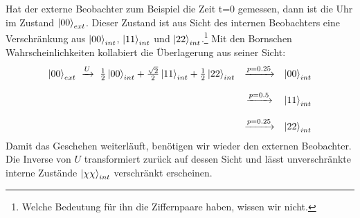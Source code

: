 \documentclass[12pt]{article}
\begin{document}
Hat der externe Beobachter zum Beispiel die Zeit t=0 gemessen, dann ist die Uhr im Zustand $\ket{00}_{ext}$. Dieser Zustand ist aus Sicht des internen Beobachters eine Verschränkung aus $\ket{00}_{int}$, $\ket{11}_{int}$ und $\ket{22}_{int}$.\footnote{Welche Bedeutung für ihn die Ziffernpaare haben, wissen wir nicht.} Mit den Bornschen Wahrscheinlichkeiten kollabiert die Überlagerung aus seiner Sicht:
\begin{equation*}
\begin{matrix}
\ket{00}_{ext} \ \xrightarrow{U} \ \frac{1}{2}\ket{00}_{int} + \frac{\sqrt{2}}{2}\ket{11}_{int} + \frac{1}{2}\ket{22}_{int} 
& \xrightarrow{p = 0.25} & \ket{00}_{int} \\ \\
& \xrightarrow{p = 0.5} & \ket{11}_{int} \\ \\
& \xrightarrow{p = 0.25} & \ket{22}_{int}
\end{matrix}
\end{equation*}
Damit das Geschehen weiterläuft, benötigen wir wieder den externen Beobachter. Die Inverse von $U$ transformiert zurück auf dessen Sicht und lässt unverschränkte interne Zustände $\ket{\chi\chi}_{int}$ verschränkt erscheinen.
\end{document}
